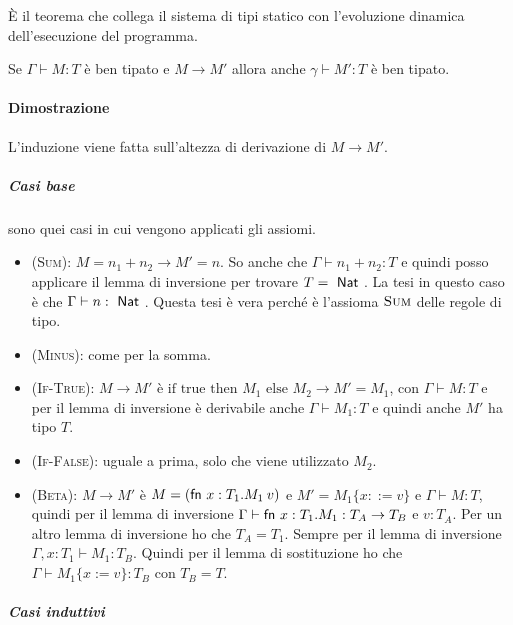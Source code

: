 \`E il teorema che collega il sistema di tipi statico con l'evoluzione dinamica dell'esecuzione del programma.

\begin{center}
	Se $\Gamma \vdash M : T$ è ben tipato e $M \rightarrow M'$ allora anche $\gamma \vdash M' : T$ è ben tipato.
\end{center}

\paragraph{Dimostrazione}

L'induzione viene fatta sull'altezza di derivazione di $M \rightarrow M'$.

\subparagraph{Casi base} sono quei casi in cui vengono applicati gli assiomi.

\begin{itemize}
	\item \textsc{(Sum)}: $M = n_1 + n_2 \rightarrow M' = n$. So anche che $\Gamma \vdash n_1 + n_2 : T$ e quindi posso applicare il lemma di inversione per trovare $ T= \Nat$. La tesi in questo caso è che $\Gamma \vdash n : \Nat$. Questa tesi è vera perché è l'assioma $\textsc{Sum}$ delle regole di tipo.
	\item \textsc{(Minus)}: come per la somma.
	\item \textsc{(If-True)}: $M \rightarrow M' $ è $\text{if true then }M_1 \text{ else }M_2 \rightarrow M' = M_1$, con $\Gamma \vdash M : T$ e per il lemma di inversione è derivabile anche $\Gamma \vdash M_1 : T$ e quindi anche $M'$ ha tipo $T$.
	\item \textsc{(If-False)}: uguale a prima, solo che viene utilizzato $M_2$.
	\item \textsc{(Beta)}: $M \rightarrow M'$ è $M = (\fn x:T_1 . M_1 \: v) $ e $M' = M_1\{x ::= v\}$ e $\Gamma \vdash M : T$, quindi per il lemma di inversione $\Gamma \vdash \fn x: T_1 . M_1 : T_A \rightarrow T_B$ e $v : T_A$. Per un altro lemma di inversione ho che $T_A = T_1$. Sempre per il lemma di inversione $\Gamma, x : T_1 \vdash M_1 : T_B$. Quindi per il lemma di sostituzione ho che $\Gamma \vdash M_1\{x := v\} : T_B$ con $T_B = T$.
\end{itemize}

\subparagraph{Casi induttivi} 

